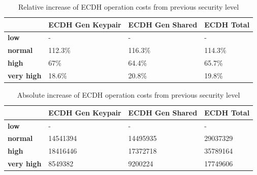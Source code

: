 \documentclass{llncs}
\begin{document}
\begin{table}[]
  \begin{tabular}{|l|l|l|l|}
  \hline
                     & \textbf{ECDH Gen Keypair} & \textbf{ECDH Gen Shared} & \textbf{ECDH Total}  \\ \hline
  \textbf{low}       & -                         & -                        & -                    \\ \hline
  \textbf{normal}    & 112.3\%                   & 116.3\%                  & 114.3\%              \\ \hline
  \textbf{high}      & 67\%                      & 64.4\%                   & 65.7\%               \\ \hline
  \textbf{very high} & 18.6\%                    & 20.8\%                   & 19.8\%               \\ \hline
  \end{tabular}
  \centering \caption{\label{table:ecdh-relative-cost-increase} Relative increase of ECDH operation costs from previous security level}
  \end{table}

\begin{table}[]
\begin{tabular}{|l|l|l|l|}
\hline
                   & \textbf{ECDH Gen Keypair} & \textbf{ECDH Gen Shared} & \textbf{ECDH Total} \\ \hline
\textbf{low}       & -                         & -                        & -                   \\ \hline
\textbf{normal}    & 14541394                  & 14495935                 & 29037329            \\ \hline
\textbf{high}      & 18416446                  & 17372718                 & 35789164            \\ \hline
\textbf{very high} & 8549382                   & 9200224                  & 17749606            \\ \hline
\end{tabular}
\centering \caption{\label{table:ecdh-absolute-cost-increase} Absolute increase of ECDH operation costs from previous security level}
\end{table}
\end{document}

